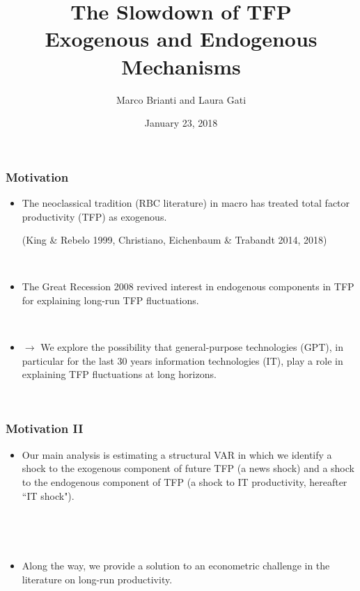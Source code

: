 \documentclass{beamer}
\author[Brianti, Gati]{Marco Brianti and Laura Gati}
\institute[Boston College]{Boston College}
\title{The Slowdown of TFP \\ Exogenous and Endogenous Mechanisms}
\date{January 23, 2018}
\begin{document}
\begin{frame}

\maketitle


\end{frame}


\begin{frame}
	\frametitle{Motivation}
	
	\begin{itemize}
	\item The neoclassical tradition (RBC literature) in macro has treated total factor productivity (TFP) as exogenous. 
	
	(King \& Rebelo 1999, Christiano, Eichenbaum \& Trabandt 2014, 2018)
	
	\
	
	\item The Great Recession 2008 revived interest in endogenous components in TFP for explaining long-run TFP fluctuations.
	
	\
	
	\item[] $\rightarrow$ We explore the possibility that general-purpose technologies (GPT), in particular for the last 30 years information technologies (IT), play a role in explaining TFP fluctuations at long horizons. 
	
	\
	
	\end{itemize} 

\end{frame}

\begin{frame}
	\frametitle{Motivation II}
	
	\begin{itemize}
	\item Our main analysis is estimating a structural VAR in which we identify a shock to the exogenous component of future TFP (a news shock) and a shock to the endogenous component of TFP (a shock to IT productivity, hereafter ``IT shock").
	
	
	\
	
	\
	
	\item Along the way, we provide a solution to an econometric challenge in the literature on long-run productivity. 
	
	\end{itemize} 

\end{frame}
\end{document}
